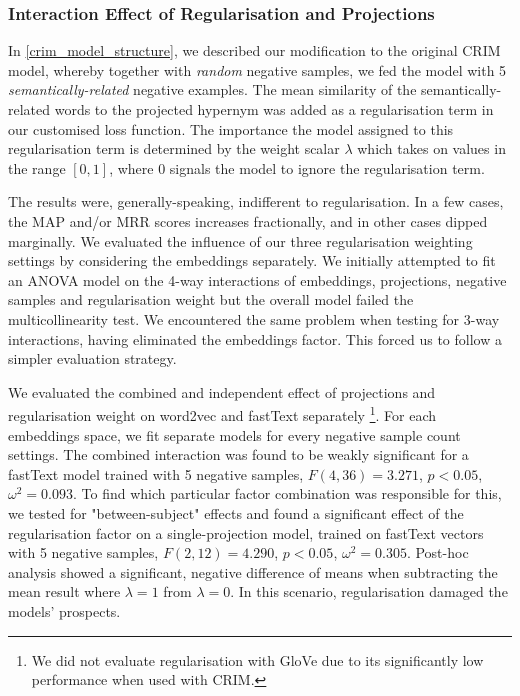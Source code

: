 \subsubsection{Interaction Effect of Regularisation and Projections}
In \cref{crim_model_structure}, we described our modification to the original CRIM model, whereby together with \textit{random} negative samples, we fed the model with 5 \textit{semantically-related} negative examples.  The mean similarity of the semantically-related words to the projected hypernym was added as a regularisation term in our customised loss function.  The importance the model assigned to this regularisation term is determined by the weight scalar $\lambda$ which takes on values in the range $[0,1]$, where 0 signals the model to ignore the regularisation term. 

The results were, generally-speaking, indifferent to regularisation.  In a few cases, the \ac{MAP} and/or \ac{MRR} scores increases fractionally, and in other cases dipped marginally.  We evaluated the influence of our three regularisation weighting settings by considering the embeddings separately.  We initially attempted to fit an \ac{ANOVA} model on the 4-way interactions of embeddings, projections, negative samples and regularisation weight but the overall model failed the multicollinearity test.  We encountered the same problem when testing for 3-way interactions, having eliminated the embeddings factor.  This forced us to follow a simpler evaluation strategy. 

We evaluated the combined and independent effect of projections and regularisation weight on word2vec and fastText separately \footnote{We did not evaluate regularisation with GloVe due to its significantly low performance when used with CRIM.}.  For each embeddings space, we fit separate models for every negative sample count settings.  The combined interaction was found to be weakly significant for a fastText model trained with 5 negative samples, $F(4,36)=3.271$, $p < 0.05$, $\omega^2=0.093$.  To find which particular factor combination was responsible for this, we tested for "between-subject" effects and found a significant effect of the regularisation factor on a single-projection model, trained on fastText vectors with 5 negative samples, $F(2,12)=4.290$, $p <  0.05$, $\omega^2=0.305$.  Post-hoc analysis showed a significant, negative difference of means when subtracting the mean result where $\lambda=1$  from $\lambda=0$.  In this scenario, regularisation damaged the models' prospects.

